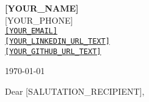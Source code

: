 \documentclass[letterpaper,11pt]{article}
\begin{document}
\begin{raggedright} %
\textbf{\Large [YOUR_NAME]} \\ %
[YOUR_PHONE] \\ %
\href{mailto:[YOUR_EMAIL]}{\nolinkurl{[YOUR_EMAIL]}} \\ %
\href{[YOUR_LINKEDIN_URL]}{\nolinkurl{[YOUR_LINKEDIN_URL_TEXT]}} \\ %
\href{[YOUR_GITHUB_URL]}{\nolinkurl{[YOUR_GITHUB_URL_TEXT]}} %
\vspace{2\baselineskip} %
\end{raggedright}

\begin{raggedright}
\today \\ %
\vspace{2\baselineskip} %
\end{raggedright}

\begin{raggedright}
\vspace{2\baselineskip} %
\end{raggedright}

\begin{raggedright}
Dear [SALUTATION_RECIPIENT], \\
\vspace{1\baselineskip} %
\end{raggedright}

\begin{raggedright}
\vspace{1\baselineskip}
\end{raggedright}
\end{document}
